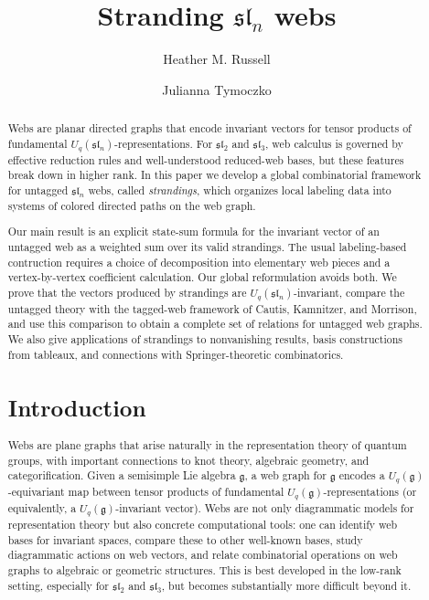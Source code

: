 \documentclass[letterpaper,11pt]{amsart}
\title{Stranding $\mathfrak{sl}_n$ webs}
\date{}
\author{Heather M. Russell}
\author{Julianna Tymoczko}
\begin{document}
\begin{abstract} 
Webs are planar directed graphs that encode invariant vectors for tensor products of fundamental $U_q(\mathfrak{sl}_n)$-representations. For $\mathfrak{sl}_2$ and $\mathfrak{sl}_3$, web calculus is governed by effective reduction rules and well-understood reduced-web bases, but these features break down in higher rank. In this paper we develop a global combinatorial framework for untagged $\mathfrak{sl}_n$ webs, called \emph{strandings}, which organizes local labeling data into systems of colored directed paths on the web graph.

Our main result is an explicit state-sum formula for the invariant vector of an untagged web as a weighted sum over its valid strandings.  The usual labeling-based contruction requires a choice of decomposition into elementary web pieces and a vertex-by-vertex coefficient calculation.  Our global reformulation avoids both.
We prove that the vectors produced by strandings are $U_q(\mathfrak{sl}_n)$-invariant, compare the untagged theory with the tagged-web framework of Cautis, Kamnitzer, and Morrison, and use this comparison to obtain a complete set of relations for untagged web graphs. We also give applications of strandings to nonvanishing results, basis constructions from tableaux, and connections with Springer-theoretic combinatorics.

\maketitle
 


 
\section{Introduction}\label{section: introduction}
 
Webs are plane graphs that arise naturally in the representation theory of quantum groups, with important connections to knot theory, algebraic geometry, and categorification. Given a semisimple Lie algebra $\mathfrak{g}$, a web graph for $\mathfrak{g}$ encodes a $U_q(\mathfrak{g})$-equivariant map between tensor products of fundamental $U_q(\mathfrak{g})$-representations (or equivalently, a $U_q(\mathfrak{g})$-invariant vector). Webs are not only diagrammatic models for representation theory but also concrete computational tools: one can identify web bases for invariant spaces, compare these to other well-known bases, study diagrammatic actions on web vectors, and relate combinatorial operations on web graphs to algebraic or geometric structures. This is best developed in the low-rank setting, especially for $\mathfrak{sl}_2$ and $\mathfrak{sl}_3$, but becomes substantially more difficult beyond it.
 

\end{abstract}
\end{document}
